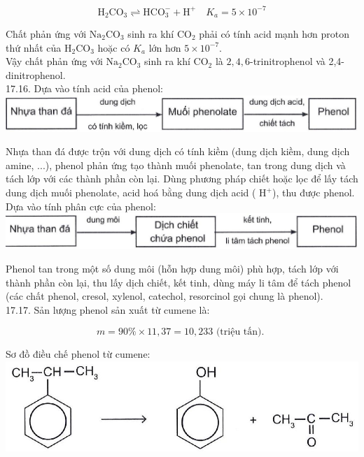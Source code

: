 \documentclass[10pt]{article}
\begin{document}
$$
\mathrm{H}_{2} \mathrm{CO}_{3} \rightleftharpoons \mathrm{HCO}_{3}^{-}+\mathrm{H}^{+} \quad K_{a}=5 \times 10^{-7}
$$

Chất phản ứng với $\mathrm{Na}_{2} \mathrm{CO}_{3}$ sinh ra khí $\mathrm{CO}_{2}$ phải có tính acid mạnh hơn proton thứ nhất của $\mathrm{H}_{2} \mathrm{CO}_{3}$ hoặc có $K_{a}$ lớn hơn $5 \times 10^{-7}$.\\
Vậy chất phản ứng với $\mathrm{Na}_{2} \mathrm{CO}_{3}$ sinh ra khí $\mathrm{CO}_{2}$ là $2,4,6$-trinitrophenol và 2,4-dinitrophenol.\\
17.16. Dựa vào tính acid của phenol:\\
\includegraphics[max width=\textwidth, center]{2025_10_23_adad5b98d65ac6665838g-35(2)}

Nhựa than đá được trộn với dung dịch có tính kiềm (dung dịch kiềm, dung dịch amine, ...), phenol phản ứng tạo thành muối phenolate, tan trong dung dịch và tách lớp với các thành phần còn lại. Dùng phương pháp chiết hoặc lọc để lấy tách dung dịch muối phenolate, acid hoá bằng dung dịch acid ( $\mathrm{H}^{+}$), thu được phenol.\\
Dựa vào tính phân cực của phenol:\\
\includegraphics[max width=\textwidth, center]{2025_10_23_adad5b98d65ac6665838g-35(1)}

Phenol tan trong một số dung môi (hỗn hợp dung môi) phù hợp, tách lớp với thành phần còn lại, thu lấy dịch chiết, kết tinh, dùng máy li tâm để tách phenol (các chất phenol, cresol, xylenol, catechol, resorcinol gọi chung là phenol).\\
17.17. Sản lượng phenol sản xuất từ cumene là:

$$
m=90 \% \times 11,37=10,233 \text { (triệu tấn). }
$$

Sơ đồ điều chế phenol từ cumene:\\
\includegraphics[max width=\textwidth, center]{2025_10_23_adad5b98d65ac6665838g-35(4)}
\end{document}
